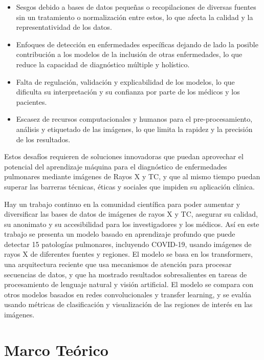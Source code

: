 \begin{itemize}
    \item Sesgos debido a bases de datos pequeñas o recopilaciones de diversas fuentes sin un
          tratamiento o normalización entre estos, lo que afecta la calidad y la representatividad
          de los datos.
    \item Enfoques de detección en enfermedades específicas dejando de lado la posible contribución
          a los modelos de la inclusión de otras enfermedades, lo que reduce la capacidad de
          diagnóstico múltiple y holístico.
    \item Falta de regulación, validación y explicabilidad de los modelos, lo que dificulta su
          interpretación y su confianza por parte de los médicos y los pacientes.
    \item Escasez de recursos computacionales y humanos para el pre-procesamiento, análisis y
          etiquetado de las imágenes, lo que limita la rapidez y la precisión de los resultados.
\end{itemize}

Estos desafíos requieren de soluciones innovadoras que puedan aprovechar el potencial del aprendizaje
máquina para el diagnóstico de enfermedades pulmonares mediante imágenes de Rayos X y TC, y que al
mismo tiempo puedan superar las barreras técnicas, éticas y sociales que impiden su aplicación clínica.

Hay un trabajo continuo en la comunidad científica para poder aumentar y diversificar las bases de
datos de imágenes de rayos X y TC, asegurar su calidad, su anonimato y su accesibilidad para los
investigadores y los médicos. Así en este trabajo se presenta un modelo basado en aprendizaje profundo
que puede detectar 15 patologías
pulmonares, incluyendo COVID-19, usando imágenes de rayos X de diferentes fuentes y regiones.
El modelo se basa en los transformers, una arquitectura reciente que usa mecanismos de atención para
procesar secuencias de datos, y que ha mostrado resultados sobresalientes en tareas de procesamiento
de lenguaje natural y visión artificial. El modelo se compara con otros modelos basados en redes
convolucionales y transfer learning, y se evalúa usando métricas de clasificación y visualización
de las regiones de interés en las imágenes.


\chapter{Marco Teórico}

